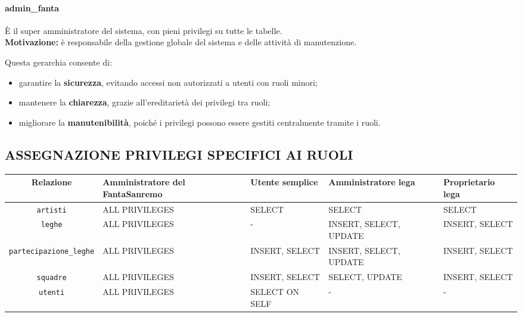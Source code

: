 \documentclass[a4paper]{article}
\begin{document}
\paragraph{admin\_fanta} È il super amministratore del sistema, con pieni privilegi su tutte le tabelle.\\
\textbf{Motivazione:} è responsabile della gestione globale del sistema e delle attività di manutenzione.

\medskip

\noindent
Questa gerarchia consente di:
\begin{itemize}
	\item garantire la \textbf{sicurezza}, evitando accessi non autorizzati a utenti con ruoli minori;
	\item mantenere la \textbf{chiarezza}, grazie all'ereditarietà dei privilegi tra ruoli;
	\item migliorare la \textbf{manutenibilità}, poiché i privilegi possono essere gestiti centralmente tramite i ruoli.
\end{itemize}




\subsection{ASSEGNAZIONE PRIVILEGI SPECIFICI AI RUOLI}

\begin{center}
	\begin{footnotesize}
		\begin{tabular}{|c|p{2.7cm}|p{2.7cm}|p{2.7cm}|p{2.7cm}|}
			\hline
			{\bf Relazione} & \parbox{2.7cm}{\bf Amministratore del FantaSanremo} & \parbox{2.7cm}{\bf Utente semplice} &  \parbox{2.7cm}{\bf Amministratore lega} & \parbox{2.7cm}{\bf Proprietario lega} \\
			\hline
			\texttt{artisti} & ALL PRIVILEGES & SELECT & SELECT & SELECT \\
			\hline
			\texttt{leghe} & ALL PRIVILEGES & - & INSERT, SELECT, UPDATE & INSERT, SELECT \\
			\hline
			\texttt{partecipazione\_leghe} & ALL PRIVILEGES & INSERT, SELECT & INSERT, SELECT, UPDATE & INSERT, SELECT \\
			\hline
			\texttt{squadre} & ALL PRIVILEGES & INSERT, SELECT & SELECT, UPDATE & INSERT, SELECT \\
			\hline
			\texttt{utenti} & ALL PRIVILEGES & SELECT ON SELF & - & - \\
			\hline
		\end{tabular}
	\end{footnotesize}
\end{center}
\end{document}

